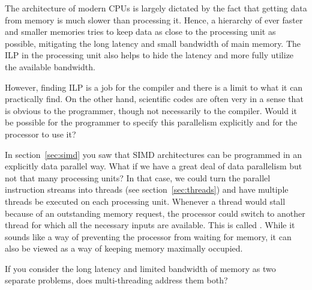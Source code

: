 
The architecture of modern CPUs is largely dictated by the fact that
getting data from memory is much slower than processing it. Hence, a
hierarchy of ever faster and smaller memories tries to keep data as close to
the processing unit as possible, mitigating the long latency and small
bandwidth of main memory. The \ac{ILP} in the processing unit 
also helps to hide the latency and more fully utilize the available
bandwidth. 

However, finding \ac{ILP} is a job for the compiler and
there is a limit to what it can practically find. On the other hand,
scientific codes are often very  in a sense
that is obvious to the programmer, though not necessarily to the
compiler. Would it be possible for the programmer to specify this
parallelism explicitly and for the processor to use it?

In section~\ref{sec:simd} you saw that \ac{SIMD} architectures can be
programmed in an explicitly data parallel way. What if we have a great
deal of data parallelism but not that many processing units? In that
case, we could turn the parallel instruction streams into threads (see
section~\ref{sec:threads}) and have multiple threads be executed on
each processing unit. Whenever a thread would stall because of an
outstanding memory request, the processor could switch to another
thread for which all the necessary inputs are available. This is
called . While it sounds like a way of
preventing the processor from waiting for memory, it can also be
viewed as a way of keeping memory maximally occupied.

\begin{exercise}
  If you consider the long latency and limited bandwidth of memory as
  two separate problems, does multi-threading address them both?
\end{exercise}

